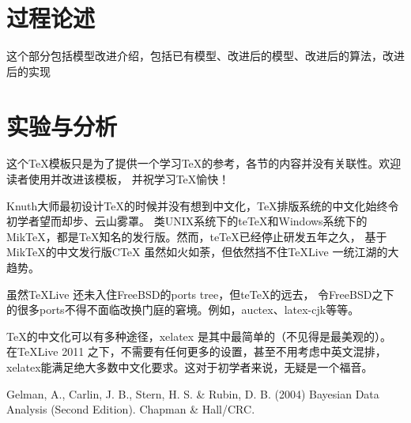 \documentclass[12pt,a4paper]{article}
\begin{document}





\section{过程论述}
这个部分包括模型改进介绍，包括已有模型、改进后的模型、改进后的算法，改进后的实现




\section{实验与分析}
这个\TeX 模板只是为了提供一个学习\TeX 的参考，各节的内容并没有关联性。欢迎读者使用并改进该模板，
并祝学习\TeX 愉快！

Knuth大师最初设计\TeX 的时候并没有想到中文化，\TeX 排版系统的中文化始终令初学者望而却步、云山雾罩。
类UNIX系统下的teTeX和Windows系统下的MikTeX，都是\TeX 知名的发行版。然而，teTeX已经停止研发五年之久，
基于MikTeX的中文发行版CTeX 虽然如火如荼，但依然挡不住\TeX Live 一统江湖的大趋势。

虽然\TeX Live 还未入住FreeBSD的ports tree，但teTeX的远去，
令FreeBSD之下的很多ports不得不面临改换门庭的窘境。例如，auctex、latex-cjk等等。


\TeX 的中文化可以有多种途径，xelatex 是其中最简单的（不见得是最美观的）。
在\TeX Live 2011 之下，不需要有任何更多的设置，甚至不用考虑中英文混排，
xelatex能满足绝大多数中文化要求。这对于初学者来说，无疑是一个福音。


\begin{thebibliography}{}
 Gelman, A., Carlin, J. B., Stern, H. S. \& Rubin, D. B.
 (2004) Bayesian Data Analysis (Second Edition). \newblock Chapman \& Hall/CRC.
\end{thebibliography}
\clearpage
\end{document}
